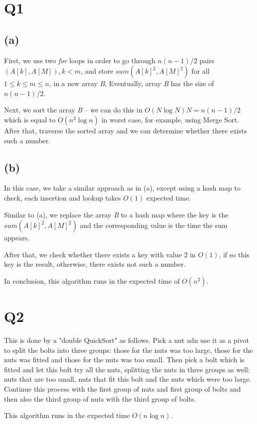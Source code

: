 \documentclass[a4paper]{article}
\begin{document}
	\section*{Q1}
	\subsection*{(a)} 
	First, we use two \textit{for} loops in order to go through $n(n-1)/2$ pairs $(A[k], A[M]), k<m$, and store $sum(A[k]^2, A[M]^2) $ for all $ 1 \leq k \leq m \leq n$, in a new array \textit{B}. Eventually, array \textit{B} has the size of $n(n-1)/2$.
	
	Next, we sort the array \textit{B} -- we can do this in $O(N\log N) N=n(n-1)/2$ which is equal to $O(n^2\log n)$ in worst case, for example, using Merge Sort. After that, traverse the sorted array and we can determine whether there exists such a number. 
		
	\subsection*{(b)}
	In this case, we take a similar approach as in (a), except using a hash map to check, each insertion and lookup takes $O(1)$ expected time.
	
	Similar to (a), we replace the array \textit{B} to a hash map where the key is the $sum(A[k]^2, A[M]^2)$ and the corresponding value is the time the sum appears.
	
	After that, we check whether there exists a key with value 2 in $O(1)$, if so this key is the result, otherwise, there exists not such a number.
	
	In conclusion, this algorithm runs in the expected time of $O(n^2)$.
	
	\section*{Q2}
	This is done by a "double QuickSort" as follows. Pick a nut adn use it as a pivot to split the bolts into three groups: those for the nuts was too large, those for the nuts was fitted and those for the nuts was too small. Then pick a bolt which is fitted and let this bolt try all the nuts, splitting the nuts in three groups as well: nuts that are too small, nuts that fit this bolt and the nuts which were too large. Continue this process with the first group of nuts and first group of bolts and then also the third group of nuts with the third group of bolts.
	
	This algorithm runs in the expected time $O(n\log n)$. 
	
\end{document}
